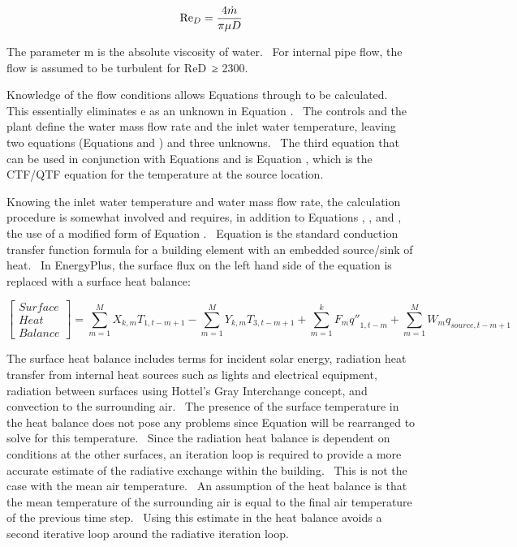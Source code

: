 \begin{equation}
{{\mathop{\rm Re}\nolimits}_D} = \frac{{4\dot m}}{{\pi \mu D}}
\end{equation}

The parameter m is the absolute viscosity of water.~ For internal pipe flow, the flow is assumed to be turbulent for ReD~≥ 2300.

Knowledge of the flow conditions allows Equations through to be calculated.~ This essentially eliminates e as an unknown in Equation .~ The controls and the plant define the water mass flow rate and the inlet water temperature, leaving two equations (Equations and ) and three unknowns.~ The third equation that can be used in conjunction with Equations and is Equation , which is the CTF/QTF equation for the temperature at the source location.

Knowing the inlet water temperature and water mass flow rate, the calculation procedure is somewhat involved and requires, in addition to Equations , , and , the use of a modified form of Equation .~ Equation is the standard conduction transfer function formula for a building element with an embedded source/sink of heat.~ In EnergyPlus, the surface flux on the left hand side of the equation is replaced with a surface heat balance:

\begin{equation}
\left[ {\begin{array}{*{20}{c}}{Surface}\\ {Heat}\\ {Balance}\end{array}} \right] = \sum\limits_{m = 1}^M {{X_{k,m}}{T_{1,t - m + 1}}}  - \sum\limits_{m = 1}^M {{Y_{k,m}}{T_{3,t - m + 1}}}  + \sum\limits_{m = 1}^k {{F_m}{{q''}_{1,t - m}}}  + \sum\limits_{m = 1}^M {{W_m}{q_{source,t - m + 1}}}
\end{equation}

The surface heat balance includes terms for incident solar energy, radiation heat transfer from internal heat sources such as lights and electrical equipment, radiation between surfaces using Hottel's Gray Interchange concept, and convection to the surrounding air.~ The presence of the surface temperature in the heat balance does not pose any problems since Equation will be rearranged to solve for this temperature.~ Since the radiation heat balance is dependent on conditions at the other surfaces, an iteration loop is required to provide a more accurate estimate of the radiative exchange within the building.~ This is not the case with the mean air temperature.~ An assumption of the heat balance is that the mean temperature of the surrounding air is equal to the final air temperature of the previous time step.~ Using this estimate in the heat balance avoids a second iterative loop around the radiative iteration loop.

